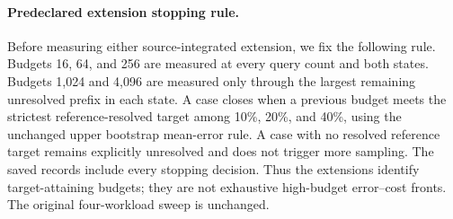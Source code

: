 \paragraph{Predeclared extension stopping rule.}
Before measuring either source-integrated extension, we fix the following
rule. Budgets 16, 64, and 256 are measured at every query count and both states.
Budgets 1,024 and 4,096 are measured only through the largest remaining
unresolved prefix in each state. A case closes when a previous budget meets
the strictest reference-resolved target among 10\%, 20\%, and 40\%, using
the unchanged upper bootstrap mean-error rule. A case with no resolved
reference target remains explicitly unresolved and does not trigger more
sampling. The saved records include every stopping decision. Thus the
extensions identify target-attaining budgets; they are not exhaustive
high-budget error--cost fronts. The original four-workload sweep is unchanged.
